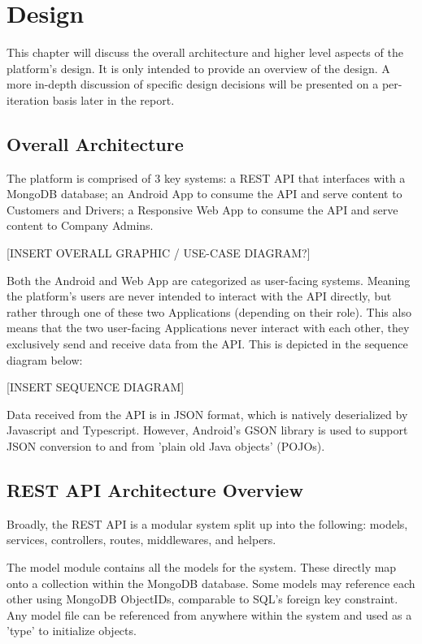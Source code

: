 \chapter{Design}
This chapter will discuss the overall architecture and higher level aspects of the platform's design. It is only intended to provide an overview of the design. A more in-depth discussion of specific design decisions will be presented on a per-iteration basis later in the report.

\section{Overall Architecture}
The platform is comprised of 3 key systems: a REST API that interfaces with a MongoDB database; an Android App to consume the API and serve content to Customers and Drivers; a Responsive Web App to consume the API and serve content to Company Admins.

[INSERT OVERALL GRAPHIC / USE-CASE DIAGRAM?]

Both the Android and Web App are categorized as user-facing systems. Meaning the platform's users are never intended to interact with the API directly, but rather through one of these two Applications (depending on their role). This also means that the two user-facing  Applications never interact with each other, they exclusively send and receive data from the API. This is depicted in the sequence diagram below:

[INSERT SEQUENCE DIAGRAM]

Data received from the API is in JSON format, which is natively deserialized by Javascript and Typescript. However, Android's GSON library is used to support JSON conversion to and from 'plain old Java objects' (POJOs).

\section{REST API Architecture Overview}
Broadly, the REST API is a modular system split up into the following: models, services, controllers, routes, middlewares, and helpers.

The model module contains all the models for the system. These directly map onto a collection within the MongoDB database. Some models may reference each other using MongoDB ObjectIDs, comparable to SQL's foreign key constraint. Any model file can be referenced from anywhere within the system and used as a 'type' to initialize objects.

